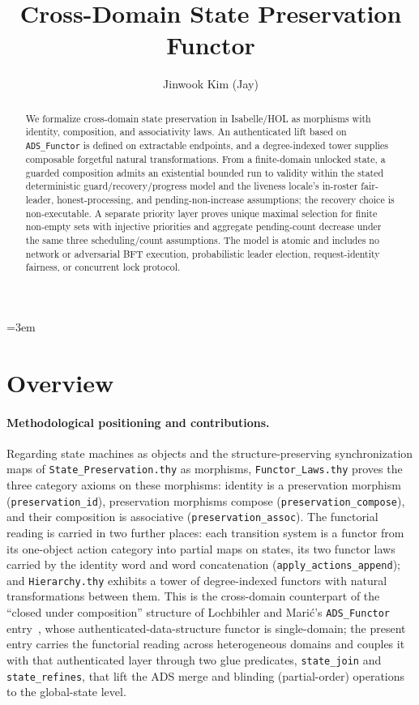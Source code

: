 \documentclass[11pt,a4paper]{article}
\begin{document}
\emergencystretch=3em

\title{Cross-Domain State Preservation Functor}
\author{Jinwook Kim (Jay)}
\maketitle

\begin{abstract}
We formalize cross-domain state preservation in Isabelle/HOL as morphisms
with identity, composition, and associativity laws.  An authenticated lift
based on \texttt{ADS\_Functor} is defined on extractable endpoints, and a
degree-indexed tower supplies composable forgetful natural transformations.
From a finite-domain unlocked state, a guarded composition admits an
existential bounded run to validity within the stated deterministic
guard/recovery/progress model and the liveness locale's in-roster fair-leader,
honest-processing, and pending-non-increase assumptions; the recovery choice
is non-executable.  A separate priority layer proves unique maximal selection
for finite non-empty sets with injective priorities and aggregate pending-count
decrease under the same three scheduling/count assumptions.  The model is
atomic and includes no network or adversarial BFT execution, probabilistic
leader election, request-identity fairness, or concurrent lock protocol.
\end{abstract}

\tableofcontents

\section{Overview}

\paragraph{Methodological positioning and contributions.}
Regarding state machines as objects and the structure-preserving
synchronization maps of \texttt{State\_Preservation.thy}
as morphisms, \texttt{Functor\_Laws.thy} proves the three category axioms on
these morphisms: identity is a preservation morphism
(\texttt{preservation\_id}), preservation morphisms compose
(\texttt{preservation\_compose}), and their composition is associative
(\texttt{preservation\_assoc}).  The functorial reading is carried in two
further places: each transition system is a functor from its one-object
action category into partial maps on states, its two functor laws carried by
the identity word and word concatenation (\texttt{apply\_actions\_append});
and \texttt{Hierarchy.thy} exhibits a tower of degree-indexed functors
with natural transformations between them.  This is the cross-domain
counterpart of the ``closed under composition'' structure of Lochbihler and
Mari\'{c}'s \texttt{ADS\_Functor} entry~\cite{ADS_Functor-AFP}, whose authenticated-data-structure
functor is single-domain; the present entry carries the functorial reading
across heterogeneous domains and couples it with that authenticated layer
through two glue predicates, \texttt{state\_join} and \texttt{state\_refines},
that lift the ADS merge and blinding (partial-order) operations to the
global-state level.
\end{document}
